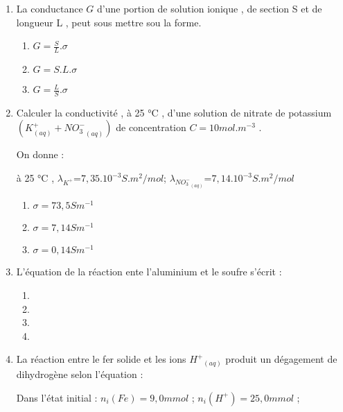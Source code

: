 \documentclass[12pt]{article}
\begin{document}
\begin{multicols}{2}
\begin{enumerate}
\begin{enumerate}
			\end{enumerate}
			\item La conductance $G$ d’une portion de solution ionique , de section S et de longueur L , peut sous mettre sou la forme.
				\begin{enumerate}
					\item $G = \frac{S}{L}.\sigma$
					\item $G = S.L.\sigma$
					\item $G = \frac{L}{S}.\sigma$
				\end{enumerate}
			\item Calculer la conductivité , à 25 °C , d’une solution de nitrate de potassium     $(K^+_{(aq)} + {NO^-_3}_{(aq)})$ de concentration $C = 10 mol.m^{-3}$ . 

				On donne : 

				à 25 °C , $\lambda_{K^+}$=$7,35.10^{-3}S.m^2/mol$;  $\lambda_{{NO^-_3}_{(aq)}}$=$7,14 .10^{-3} S.m^2/mol$
				\begin{enumerate}
					\item $\sigma = 73,5Sm^{-1}$
					\item $\sigma = 7,14Sm^{-1}$
					\item $\sigma = 0,14Sm^{-1}$
				\end{enumerate}
			\item L’équation de la réaction ente l’aluminium et le soufre s’écrit : 
			\begin{enumerate}
				\item {}
				\item {}
				\item {}
				\item {}
			\end{enumerate}
		\item La réaction entre le fer solide et les ions ${H^+}_{(aq)}$ produit un dégagement de dihydrogène selon l’équation : 

			Dans l’état initial : $n_i(Fe) = 9,0mmol$ ; $n_i(H^+) = 25,0mmol$ ;


\end{enumerate}
\end{multicols}
\end{document}
